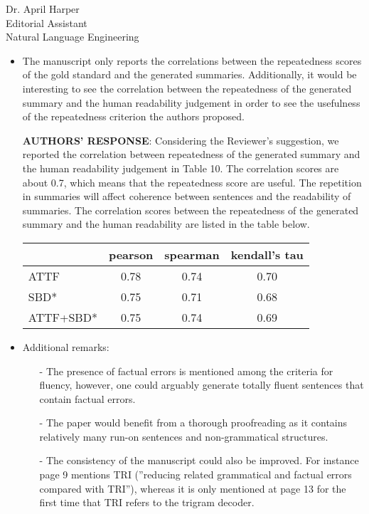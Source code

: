 \documentclass[11pt]{letter} %
\theoremstyle{definition}
\begin{document}
\begin{letter}{Dr. April Harper \\
            Editorial Assistant \\
			Natural Language Engineering}
\begin{enumerate}
\begin{itemize}
                \item The manuscript only reports the correlations between the repeatedness scores of the gold standard and the generated summaries. Additionally, it would be interesting to see the correlation between the repeatedness of the generated summary and the human readability judgement in order to see the usefulness of the repeatedness criterion the authors proposed.
				\item[] \textbf{AUTHORS' RESPONSE}:  
				Considering the Reviewer's suggestion, we reported the correlation between repeatedness of the generated summary and the human readability judgement
				in Table 10.
				The correlation scores are about 0.7, which means that the repeatedness score are useful. The repetition in summaries will affect coherence between sentences and the readability of summaries. The correlation scores between the repeatedness of the generated summary and the human readability are listed in the table below.
				\begin{center}
				\begin{tabular}{|l|c|c|c|}
					\hline
					& pearson  & spearman & kendall's tau \\
					\hline
					ATTF & 0.78 & 0.74 & 0.70 \\
					SBD* & 0.75 & 0.71 & 0.68 \\
					ATTF+SBD* & 0.75 & 0.74 & 0.69 \\
					\hline
				\end{tabular}
                \end{center}
				\item Additional remarks:
				\begin{itemize}
                \item[-] The presence of factual errors is mentioned among the criteria for fluency, however, one could arguably generate totally fluent sentences that contain factual errors.
                \item[-] The paper would benefit from a thorough proofreading as it contains relatively many run-on sentences and non-grammatical structures.
                \item[-] The consistency of the manuscript could also be improved. For instance page 9 mentions TRI (''reducing related grammatical and factual errors compared with TRI''), whereas it is only mentioned at page 13 for the first time that TRI refers to the trigram decoder.

\end{itemize}
\end{itemize}
\end{enumerate}
\end{letter}
\end{document}
